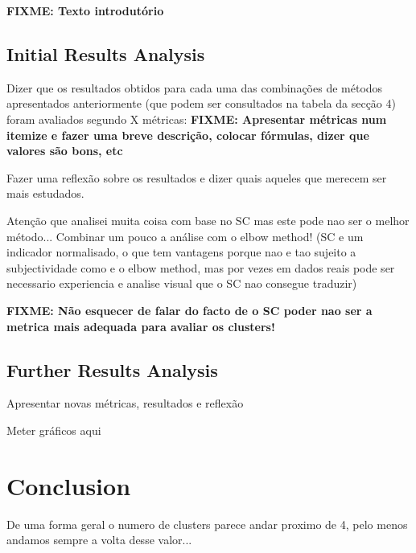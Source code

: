 \documentclass[9pt,journal,compsoc]{IEEEtran}
\begin{document}
\textbf{FIXME: Texto introdutório}

\subsection{Initial Results Analysis}

Dizer que os resultados obtidos para cada uma das combinações de métodos apresentados anteriormente (que podem ser consultados na tabela da secção 4) foram avaliados segundo X métricas: \textbf{FIXME: Apresentar métricas num itemize e fazer uma breve descrição, colocar fórmulas, dizer que valores são bons, etc}

Fazer uma reflexão sobre os resultados e dizer quais aqueles que merecem ser mais estudados.

Atenção que analisei muita coisa com base no SC mas este pode nao ser o melhor método... Combinar um pouco a análise com o elbow method! (SC e um indicador normalisado, o que tem vantagens porque nao e tao sujeito a subjectividade como e o elbow method, mas por vezes em dados reais pode ser necessario experiencia e analise visual que o SC nao consegue traduzir)

\textbf{FIXME: Não esquecer de falar do facto de o SC poder nao ser a metrica mais adequada para avaliar os clusters!}

\subsection{Further Results Analysis}

Apresentar novas métricas, resultados e reflexão

Meter gráficos aqui

\section{Conclusion}
\label{conclusions}

De uma forma geral o numero de clusters parece andar proximo de 4, pelo menos andamos sempre a volta desse valor...




\end{document}
